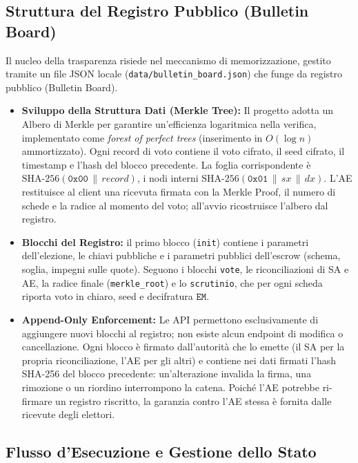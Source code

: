 \documentclass[12pt,a4paper]{article}
\begin{document}
\subsection{Struttura del Registro Pubblico (Bulletin Board)}

Il nucleo della trasparenza risiede nel meccanismo di memorizzazione, gestito tramite un file JSON locale (\texttt{data/bulletin\_board.json}) che funge da registro pubblico (Bulletin Board).

\begin{itemize}
  \item \textbf{Sviluppo della Struttura Dati (Merkle Tree):} Il progetto adotta un Albero di Merkle per garantire un'efficienza logaritmica nella verifica, implementato come \textit{forest of perfect trees} (inserimento in $O(\log n)$ ammortizzato). Ogni record di voto contiene il voto cifrato, il seed cifrato, il timestamp e l'hash del blocco precedente. La foglia corrispondente è $\mathrm{SHA\text{-}256}(\mathtt{0x00} \,\|\, \mathit{record})$, i nodi interni $\mathrm{SHA\text{-}256}(\mathtt{0x01} \,\|\, \mathit{sx} \,\|\, \mathit{dx})$. L'AE restituisce al client una ricevuta firmata con la Merkle Proof, il numero di schede e la radice al momento del voto; all'avvio ricostruisce l'albero dal registro.
  \item \textbf{Blocchi del Registro:} il primo blocco (\texttt{init}) contiene i parametri dell'elezione, le chiavi pubbliche e i parametri pubblici dell'escrow (schema, soglia, impegni sulle quote). Seguono i blocchi \texttt{vote}, le riconciliazioni di SA e AE, la radice finale (\texttt{merkle\_root}) e lo \texttt{scrutinio}, che per ogni scheda riporta voto in chiaro, seed e decifratura $\mathtt{EM}$.
  \item \textbf{Append-Only Enforcement:} Le API permettono esclusivamente di aggiungere nuovi blocchi al registro; non esiste alcun endpoint di modifica o cancellazione. Ogni blocco è firmato dall'autorità che lo emette (il SA per la propria riconciliazione, l'AE per gli altri) e contiene nei dati firmati l'hash SHA-256 del blocco precedente: un'alterazione invalida la firma, una rimozione o un riordino interrompono la catena. Poiché l'AE potrebbe ri-firmare un registro riscritto, la garanzia contro l'AE stessa è fornita dalle ricevute degli elettori.
\end{itemize}

\subsection{Flusso d'Esecuzione e Gestione dello Stato}
\end{document}
